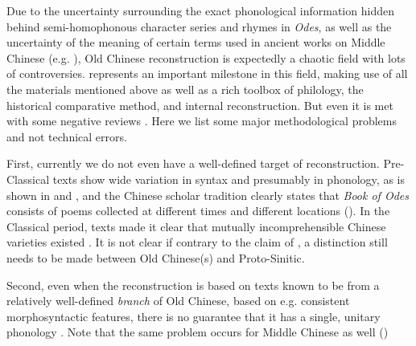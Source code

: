 \documentclass[UTF8, a4paper, oneside, scheme=plain, 12pt]{ctexrep}
\newcommand*{\citepage}[1]{p.~{#1}}
\newcommand*{\citepages}[1]{pp.~{#1}}
\newcommand{\work}[1]{\textit{#1}}
\begin{document}
Due to the uncertainty surrounding the exact phonological information
hidden behind semi-homophonous character series and rhymes in \work{Odes},
as well as the uncertainty of the meaning of certain terms used in 
ancient works on Middle Chinese (e.g. ),
Old Chinese reconstruction is expectedly a chaotic field with lots of controversies.
\citet{baxter2014old} represents an important milestone in this field,
making use of all the materials mentioned above as well as
a rich toolbox of philology, the historical comparative method, and internal reconstruction.
But even it is met with some negative reviews \citep{harbsmeier2016irrefutable}.
Here we list some major methodological problems and not technical errors.

First, currently we do not even have a well-defined target of reconstruction.
Pre-Classical texts show wide variation in syntax and presumably in phonology,
as is shown in  and ,
and the Chinese scholar tradition clearly states that 
\work{Book of Odes} consists of poems collected at different times and different locations 
(\citealt[\citepages{478-480}]{harbsmeier2016irrefutable}).
In the Classical period, texts made it clear that mutually incomprehensible Chinese varieties existed \citep[\citepages{446-447}]{harbsmeier2016irrefutable}.
It is not clear if contrary to the claim of \citet[\citepage{2}]{baxter2014old}, a distinction still needs to be made between Old Chinese(s) and Proto-Sinitic.

Second, even when the reconstruction is based on texts known to be from a relatively well-defined \emph{branch} of Old Chinese,
based on e.g. consistent morphosyntactic features,
there is no guarantee that it has a single, unitary phonology
\citep[\citepages{488-490}]{harbsmeier2016irrefutable}.
Note that the same problem occurs for Middle Chinese as well ()
\end{document}
